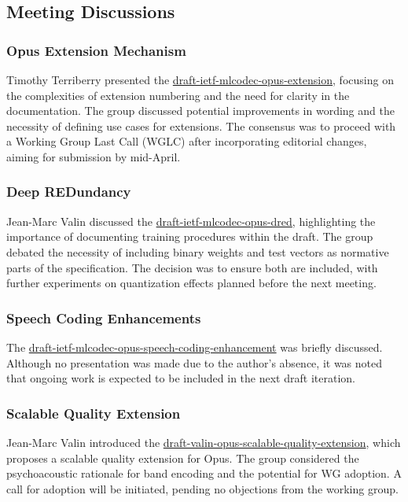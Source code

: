 \documentclass{article}
\begin{document}
\subsection{Meeting Discussions}

\subsubsection{Opus Extension Mechanism}
Timothy Terriberry presented the \href{https://datatracker.ietf.org/doc/html/draft-ietf-mlcodec-opus-extension}{draft-ietf-mlcodec-opus-extension}, focusing on the complexities of extension numbering and the need for clarity in the documentation. The group discussed potential improvements in wording and the necessity of defining use cases for extensions. The consensus was to proceed with a Working Group Last Call (WGLC) after incorporating editorial changes, aiming for submission by mid-April.

\subsubsection{Deep REDundancy}
Jean-Marc Valin discussed the \href{https://datatracker.ietf.org/doc/html/draft-ietf-mlcodec-opus-dred}{draft-ietf-mlcodec-opus-dred}, highlighting the importance of documenting training procedures within the draft. The group debated the necessity of including binary weights and test vectors as normative parts of the specification. The decision was to ensure both are included, with further experiments on quantization effects planned before the next meeting.

\subsubsection{Speech Coding Enhancements}
The \href{https://datatracker.ietf.org/doc/html/draft-ietf-mlcodec-opus-speech-coding-enhancement}{draft-ietf-mlcodec-opus-speech-coding-enhancement} was briefly discussed. Although no presentation was made due to the author's absence, it was noted that ongoing work is expected to be included in the next draft iteration.

\subsubsection{Scalable Quality Extension}
Jean-Marc Valin introduced the \href{https://datatracker.ietf.org/doc/html/draft-valin-opus-scalable-quality-extension}{draft-valin-opus-scalable-quality-extension}, which proposes a scalable quality extension for Opus. The group considered the psychoacoustic rationale for band encoding and the potential for WG adoption. A call for adoption will be initiated, pending no objections from the working group.
\end{document}
